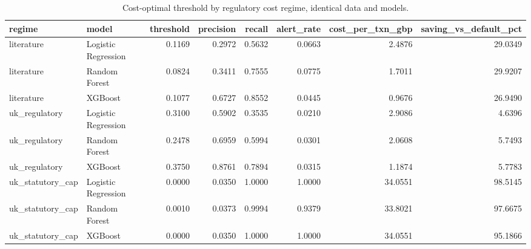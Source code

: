 \begin{table}
\caption{Cost-optimal threshold by regulatory cost regime, identical data and models.}
\label{tab:table2_regime_comparison}
\begin{tabular}{llrrrrrr}
\toprule
regime & model & threshold & precision & recall & alert\_rate & cost\_per\_txn\_gbp & saving\_vs\_default\_pct \\
\midrule
literature & Logistic Regression & 0.1169 & 0.2972 & 0.5632 & 0.0663 & 2.4876 & 29.0349 \\
literature & Random Forest & 0.0824 & 0.3411 & 0.7555 & 0.0775 & 1.7011 & 29.9207 \\
literature & XGBoost & 0.1077 & 0.6727 & 0.8552 & 0.0445 & 0.9676 & 26.9490 \\
uk\_regulatory & Logistic Regression & 0.3100 & 0.5902 & 0.3535 & 0.0210 & 2.9086 & 4.6396 \\
uk\_regulatory & Random Forest & 0.2478 & 0.6959 & 0.5994 & 0.0301 & 2.0608 & 5.7493 \\
uk\_regulatory & XGBoost & 0.3750 & 0.8761 & 0.7894 & 0.0315 & 1.1874 & 5.7783 \\
uk\_statutory\_cap & Logistic Regression & 0.0000 & 0.0350 & 1.0000 & 1.0000 & 34.0551 & 98.5145 \\
uk\_statutory\_cap & Random Forest & 0.0010 & 0.0373 & 0.9994 & 0.9379 & 33.8021 & 97.6675 \\
uk\_statutory\_cap & XGBoost & 0.0000 & 0.0350 & 1.0000 & 1.0000 & 34.0551 & 95.1866 \\
\bottomrule
\end{tabular}
\end{table}
